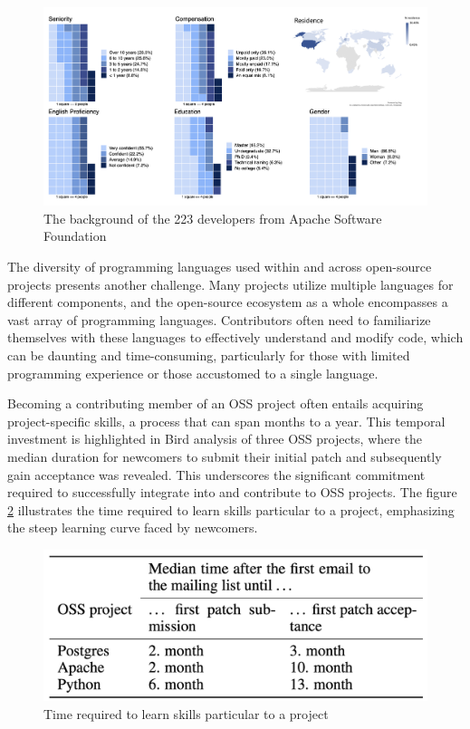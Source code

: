 \begin{figure}[ht]
    \centering
    \includegraphics[width=1\linewidth]{figs/contributor_background.png}
    \caption{The background of the 223 developers from Apache Software Foundation \cite{04guizani2021long}}
    \label{fig:contributor_background}
\end{figure}

The diversity of programming languages used within and across open-source projects presents another challenge. Many projects utilize multiple languages for different components, and the open-source ecosystem as a whole encompasses a vast array of programming languages. Contributors often need to familiarize themselves with these languages to effectively understand and modify code, which can be daunting and time-consuming, particularly for those with limited programming experience or those accustomed to a single language.

Becoming a contributing member of an OSS project often entails acquiring project-specific skills, a process that can span months to a year. This temporal investment is highlighted in Bird \cite{bird2007open} analysis of three OSS projects, where the median duration for newcomers to submit their initial patch and subsequently gain acceptance was revealed. This underscores the significant commitment required to successfully integrate into and contribute to OSS projects. The figure \ref{fig:timeskill} illustrates the time required to learn skills particular to a project, emphasizing the steep learning curve faced by newcomers.

\begin{figure}[ht]
    \centering
    \includegraphics[width=0.65\linewidth]{figs/timeskill.png}
    \caption{Time required to learn skills particular to a project \cite{bird2007open}}
    \label{fig:timeskill}
\end{figure}


